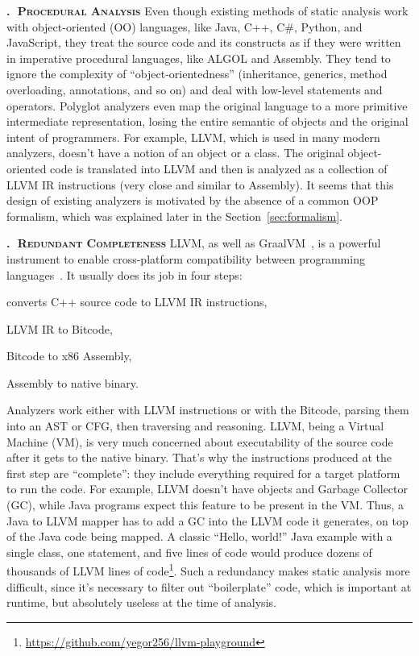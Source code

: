 \documentclass[12pt]{article}
\newcommand{\nospell}[1]{#1}
\newcounter{sector}[section]
\renewcommand\thesector{\thesection.\arabic{sector}}
\newcommand{\sector}[1]{\refstepcounter{sector}\vspace{6pt}\textbf{\textsc{\thesector $\;$ #1}}\quad}
\begin{document}
\sector{Procedural Analysis}
Even though existing methods of static analysis work with object-oriented (OO)
languages, like Java, C++, C\#, Python, and JavaScript, they treat the source
code and its constructs as if they were written in imperative procedural languages, like
ALGOL and Assembly. They tend to ignore the complexity of \nospell{``object-orientedness''}
(inheritance, generics, method overloading, annotations, and so on) and deal with low-level statements
and operators. Polyglot analyzers even map the original language to a more primitive
intermediate representation, losing the entire semantic of objects and the original
intent of programmers.
For example, LLVM, which is used in many modern analyzers,
doesn't have a notion of an object or a class. The original object-oriented
code is translated into LLVM and then is analyzed as a collection of LLVM IR instructions
(very close and similar to Assembly).
It seems that this design of existing analyzers is motivated by the absence
of a common OOP formalism, which was explained later in the Section~\ref{sec:formalism}.

\sector{Redundant Completeness}
LLVM, as well as GraalVM~\citep{wurthinger2013one},
is a powerful instrument to enable cross-platform
compatibility between programming languages~\citep{lattner2004llvm}.
It usually does its job in four steps:
\begin{enumerate*}[label={\arabic*)}]
\item converts C++ source code to LLVM IR instructions,
\item LLVM IR to Bitcode,
\item Bitcode to x86 Assembly,
\item Assembly to native binary.
\end{enumerate*}
Analyzers work either with LLVM instructions or with the Bitcode,
parsing them into an AST or CFG, then traversing and reasoning.
%
LLVM, being a Virtual Machine (VM), is very much concerned about executability of the
source code after it gets to the native binary. That's why the instructions
produced at the first step are ``complete'': they include everything required
for a target platform to run the code.
For example, LLVM doesn't have objects and Garbage Collector (GC), while Java
programs expect this feature to be present in the VM. Thus, a Java to LLVM
mapper has to add a GC into the LLVM code it generates,
on top of the Java code being mapped. A classic
``Hello, world!'' Java example with a single class, one statement, and five
lines of code would produce dozens of thousands of LLVM lines of code\footnote{%
\url{https://github.com/yegor256/llvm-playground}}.
%
Such a redundancy makes static analysis more difficult, since it's
necessary to filter out ``boilerplate'' code, which is important at
runtime, but absolutely useless at the time of analysis.
\end{document}
